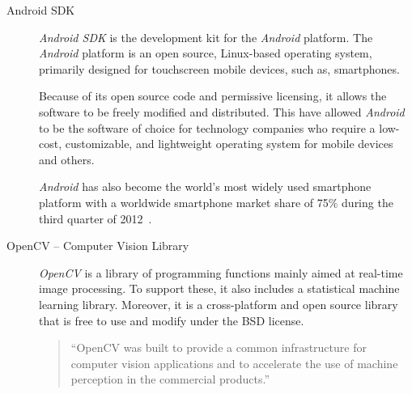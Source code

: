 \begin{description}

\item[Android SDK] \hfill 

\emph{Android SDK} is the development kit for the \emph{Android} 
platform. The \emph{Android} platform is an open source, Linux-based 
operating system, primarily designed for touchscreen mobile devices, 
such as, smartphones.

Because of its open source code and permissive licensing, it allows 
the software to be freely modified and distributed. This have allowed
\emph{Android} to be the software of choice for technology companies
who require a low-cost, customizable, and lightweight operating system 
for mobile devices and others.

\emph{Android} has also become the world's most widely used smartphone 
platform with a worldwide smartphone market share of 75\%
during the third quarter of 2012~\cite{Idc2013Android}.

\pagebreak

\item[OpenCV -- Computer Vision Library] \hfill 

\emph{OpenCV} is a library of programming functions mainly aimed at 
real-time image processing. To support these, it also includes a 
statistical machine learning library. Moreover, it is a cross-platform 
and open source library that is free to use and modify under the BSD 
license.

\begin{quote}
  ``OpenCV was built to provide a common infrastructure for computer 
  vision applications and to accelerate the use of machine perception 
  in the commercial products.''~\cite{Opencv2013About}
\end{quote}

\end{description}
